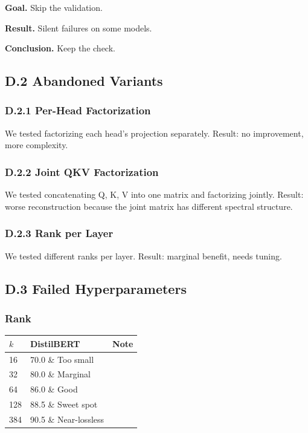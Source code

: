 \textbf{Goal.} Skip the validation.

\textbf{Result.} Silent failures on some models.

\textbf{Conclusion.} Keep the check.

\subsection{D.2 Abandoned Variants}

\subsubsection{D.2.1 Per-Head Factorization}

We tested factorizing each head's projection separately. Result: no 
improvement, more complexity.

\subsubsection{D.2.2 Joint QKV Factorization}

We tested concatenating Q, K, V into one matrix and factorizing jointly. 
Result: worse reconstruction because the joint matrix has different spectral 
structure.

\subsubsection{D.2.3 Rank per Layer}

We tested different ranks per layer. Result: marginal benefit, needs tuning.

\subsection{D.3 Failed Hyperparameters}

\subsubsection{Rank}

\begin{table}[H]
\centering
\small
\begin{tabular}{lll}
\toprule
\textbf{$k$} & \textbf{DistilBERT} & \textbf{Note} \\
\midrule
16 & 70.0 \& Too small \\
32 & 80.0 \& Marginal \\
64 & 86.0 \& Good \\
128 & 88.5 \& Sweet spot \\
384 & 90.5 \& Near-lossless \\
\bottomrule
\end{tabular}
\end{table}

